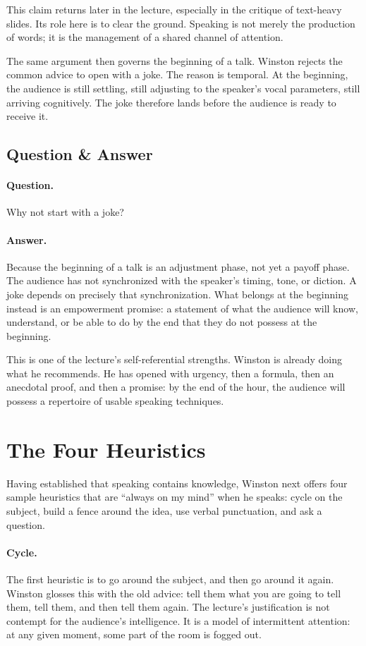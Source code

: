 This claim returns later in the lecture, especially in the critique of text-heavy slides. Its role here is to clear the ground. Speaking is not merely the production of words; it is the management of a shared channel of attention.

The same argument then governs the beginning of a talk. Winston rejects the common advice to open with a joke. The reason is temporal. At the beginning, the audience is still settling, still adjusting to the speaker's vocal parameters, still arriving cognitively. The joke therefore lands before the audience is ready to receive it.

\subsection{Question \& Answer}

\paragraph{Question.} Why not start with a joke?

\paragraph{Answer.} Because the beginning of a talk is an adjustment phase, not yet a payoff phase. The audience has not synchronized with the speaker's timing, tone, or diction. A joke depends on precisely that synchronization. What belongs at the beginning instead is an empowerment promise: a statement of what the audience will know, understand, or be able to do by the end that they do not possess at the beginning.

This is one of the lecture's self-referential strengths. Winston is already doing what he recommends. He has opened with urgency, then a formula, then an anecdotal proof, and then a promise: by the end of the hour, the audience will possess a repertoire of usable speaking techniques.

\section{The Four Heuristics}

Having established that speaking contains knowledge, Winston next offers four sample heuristics that are ``always on my mind'' when he speaks: cycle on the subject, build a fence around the idea, use verbal punctuation, and ask a question.

\paragraph{Cycle.} The first heuristic is to go around the subject, and then go around it again. Winston glosses this with the old advice: tell them what you are going to tell them, tell them, and then tell them again. The lecture's justification is not contempt for the audience's intelligence. It is a model of intermittent attention: at any given moment, some part of the room is fogged out.

